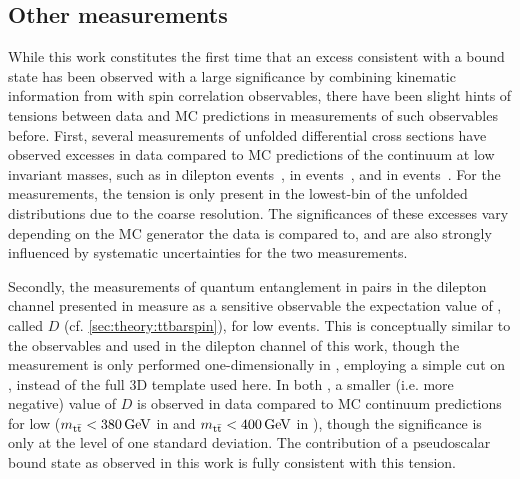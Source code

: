 \subsection{Other \ttbartitle measurements}

While this work constitutes the first time that an excess consistent with a \ttbar bound state has been observed with a large significance by combining kinematic information from \mtt with \ttbar spin correlation observables, there have been slight hints of tensions between data and MC predictions in measurements of such observables before. First, several measurements of unfolded \ttbar differential cross sections have observed excesses in data compared to MC predictions of the \ttbar continuum at low invariant masses, such as \mtt in dilepton events~\cite{CMS:TOP-20-006}, \mll in \emu events~\cite{ATLAS:2023gsl}, and \mtt in \ljets events~\cite{CMS:TOP-17-002}. For the \mtt measurements, the tension is only present in the lowest-\mtt bin of the unfolded distributions due to the coarse \mtt resolution. The significances of these excesses vary depending on the MC generator the data is compared to, and are also strongly influenced by systematic uncertainties for the two \mtt measurements.

Secondly, the measurements of quantum entanglement in \ttbar pairs in the dilepton channel presented in  measure as a sensitive observable the expectation value of \chel, called $D$ (cf. \cref{sec:theory:ttbarspin}), for low \mtt events. This is conceptually similar to the observables \mtt and \chel used in the dilepton channel of this work, though the measurement is only performed one-dimensionally in \chel, employing a simple cut on \mtt, instead of the full 3D \mttchelchan template used here. In both , a smaller (i.e. more negative) value of $D$ is observed in data compared to MC \ttbar continuum predictions for low \mtt ($\mtt < \SI{380}{\GeV}$ in  and $\mtt < \SI{400}{\GeV}$ in ), though the significance is only at the level of one standard deviation. The contribution of a pseudoscalar \ttbar bound state as observed in this work is fully consistent with this tension. %




